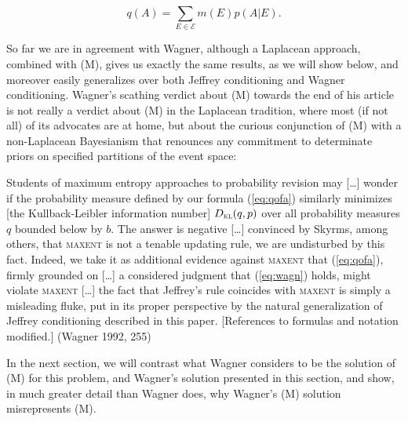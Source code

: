 \documentclass[12pt]{article}
\begin{document}
\begin{equation}
  \label{eq:qofa}
  q(A)=\sum_{E\in\mathcal{E}}m(E)p(A|E).
\end{equation}

So far we are in agreement with Wagner, although a Laplacean approach,
combined with (M), gives us exactly the same results, as we will show
below, and moreover easily generalizes over both Jeffrey conditioning
and Wagner conditioning.
Wagner's scathing verdict about (M) towards the end of his article is
not really a verdict about (M) in the Laplacean tradition, where most
(if not all) of its advocates are at home, but about the curious
conjunction of (M) with a non-Laplacean Bayesianism that renounces any
commitment to determinate priors on specified partitions of the event
space:

\begin{quotex}
  Students of maximum entropy approaches to probability revision may
  [\ldots] wonder if the probability measure defined by our formula
  (\ref{eq:qofa}) similarly minimizes [the Kullback-Leibler
  information number] $D_{\textsc{kl}}(q,p)$ over all probability
  measures $q$ bounded below by $b$. The answer is negative [\ldots]
  convinced by Skyrms, among others, that \textsc{maxent} is not a
  tenable updating rule, we are undisturbed by this fact. Indeed, we
  take it as additional evidence against \textsc{maxent} that
  (\ref{eq:qofa}), firmly grounded on [\ldots] a considered judgment
  that (\ref{eq:wagn}) holds, might violate \textsc{maxent} [\ldots]
  the fact that Jeffrey's rule coincides with \textsc{maxent} is
  simply a misleading fluke, put in its proper perspective by the
  natural generalization of Jeffrey conditioning described in
  this paper. [References to formulas and notation modified.]
  (Wagner 1992, 255)
\end{quotex}

In the next section, we will contrast what Wagner considers to be the
solution of (M) for this problem,  and
Wagner's solution presented in this section,  and show, in much greater detail than Wagner does, why
Wagner's (M) solution misrepresents (M).
\end{document}
